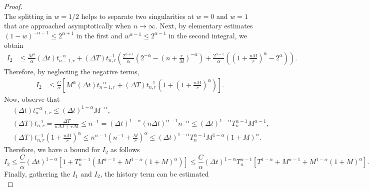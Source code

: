 \documentclass[12pt,a4paper]{article}
\begin{document}
\begin{proof}
\begin{equation}
	\end{equation}
	The splitting in $w = 1/2$ helps to separate two singularities at $w = 0$ and $w = 1$ that are approached asymptotically when $n\rightarrow\infty$. Next, by elementary estimates $(1-w)^{-\alpha-1}\leq 2^{\alpha+1}$ in the first and $w^{\alpha-1} \leq 2^{\alpha-1}$ in the second integral, we obtain
	\begin{equation}
		\begin{split}
			I_2 &\leq \frac{M^{\alpha}}{\alpha}(\Delta t) t_{n-1,r}^{-\alpha} + (\Delta T) t_{n,r}^{-1} \left(\frac{2^{\alpha+1}}{\alpha} \left(2^{-\alpha} - \left(n+\frac{r}{M}\right)^{-\alpha}\right)  +\frac{2^{\alpha-1}}{\alpha}\left(\left(1+\frac{nM}{r}\right)^\alpha - 2^\alpha\right)\right).
		\end{split}
	\end{equation}
	Therefore, by neglecting the negative terms, 
	\begin{equation}
		\begin{split}
			I_2 &\leq \frac{C}{\alpha}\left[M^{\alpha}(\Delta t) t_{n-1,r}^{-\alpha} + (\Delta T) t_{n,r}^{-1} \left(1 + \left(1+\frac{nM}{r}\right)^\alpha\right)\right].
		\end{split}
	\end{equation}
	Now, observe that
	\begin{equation}
		\begin{split}
			&(\Delta t)t_{n-1,r}^{-\alpha}
			\leq (\Delta t)^{1-\alpha} M^{-\alpha}, \\ 
			&(\Delta T) t_{n,r}^{-1} = \frac{\Delta T}{n\Delta T + r \Delta t} \leq n^{-1} = (\Delta t)^{1-\alpha} (n\Delta t)^{\alpha-1} n^{-\alpha} \leq (\Delta t)^{1-\alpha} T_n^{\alpha-1} M^{\alpha-1}, \\
			&(\Delta T) t_{n,r}^{-1} \left(1+\frac{nM}{r}\right)^\alpha \leq n^{\alpha-1} \left(n^{-1}+\frac{M}{r}\right)^\alpha \leq (\Delta t)^{1-\alpha} T_n^{\alpha-1} M^{1-\alpha} (1+M)^\alpha.
		\end{split}
	\end{equation}
	Therefore, we have a bound for $I_2$ as follows
	\begin{equation}
		I_2 \leq \frac{C}{\alpha}(\Delta t)^{1-\alpha} \left[1+T_n^{\alpha-1}\left(M^{\alpha-1} + M^{1-\alpha} (1+M)^\alpha\right) \right] \leq \frac{C}{\alpha}(\Delta t)^{1-\alpha}T_n^{\alpha-1}\left[T^{1-\alpha}+M^{\alpha-1} + M^{1-\alpha} (1+M)^\alpha\right].
	\end{equation}
	Finally, gathering the $I_1$ and $I_2$, the history term can be estimated 
	\begin{equation}

\end{equation}
\end{proof}
\end{document}

